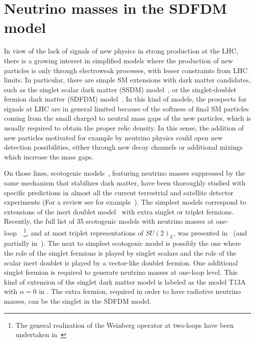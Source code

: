 \section{Neutrino masses in the SDFDM model}
%
In view of the lack of signals of new physics in strong production at the
LHC, there is a growing interest in simplified models where the
production of new particles is only through electroweak processes,
with lesser constraints from LHC limits.
In particular, there are simple SM extensions with
dark matter candidates, such as the singlet scalar dark
matter (SSDM)
model~\cite{Silveira:1985rk,McDonald:1993ex,Burgess:2000yq}, or the
singlet-doublet fermion dark matter (SDFDM)
model~\cite{ArkaniHamed:2005yv,Mahbubani:2005pt,D'Eramo:2007ga,Enberg:2007rp,Cohen:2011ec,Cheung:2013dua}.
In this kind of models, the prospects for signals at LHC are in general
limited because of the softness of final SM particles coming from the
small charged to neutral mass gaps of the new particles, which is usually required 
to obtain the proper relic density.
In this sense, the addition of new particles motivated for example by
neutrino physics could open new detection possibilities, either
through new decay channels or additional mixings which increase the
mass gaps.

On those lines, scotogenic models~\cite{Ma:2006km}, featuring neutrino masses suppressed
by the same mechanism that stabilizes dark matter, have been thoroughly studied with specific predictions in almost all the current terrestrial and satellite detector experiments (For a review
see for example~\cite{Boucenna:2014zba}).
The simplest models correspond to extensions of the inert doublet
model~\cite{Deshpande:1977rw,Barbieri:2006dq} with extra singlet or
triplet fermions.
Recently, the full list of 35 scotogenic models with neutrino masses at
one-loop~\cite{Ma:1998dn,Bonnet:2012kz}~\footnote{The general
  realization of the Weinberg operator at two-loops have been undertaken
  in~\cite{Sierra:2014rxa}}, and at most triplet representations of
$SU(2)_L$, was presented in~\cite{Restrepo:2013aga} (and partially
in~\cite{Law:2013saa}).
The next to simplest scotogenic model is possibly the one where the
role of the singlet fermions is played by singlet scalars and the role
of the scalar inert doublet is played by a vector-like doublet fermion.
One additional singlet fermion is required to generate neutrino masses
at one-loop level.
This kind of extension of the singlet dark matter model is labeled
as the model T13A with $\alpha=0$ in \cite{Restrepo:2013aga}. The
extra fermion, required in order to have radiative neutrino masses, can
be the singlet in the SDFDM model.

